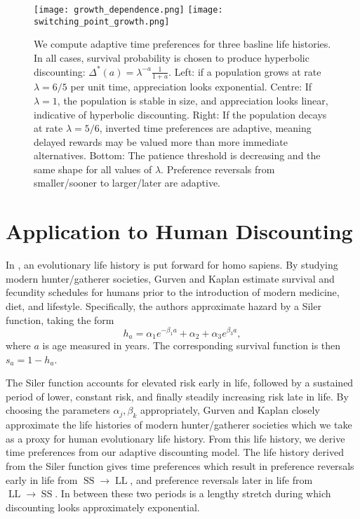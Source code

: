 \documentclass[titlepage, hidelinks, 12pt]{article}
\theoremstyle{plain}
\theoremstyle{remark}
\theoremstyle{definition}
\DeclareMathOperator{\smallersooner}{SS}
\DeclareMathOperator{\largerlater}{LL}
\begin{document}
\begin{figure}[H]
    \centering
    \texttt{[image: growth\_dependence.png]}
    \texttt{[image: switching\_point\_growth.png]}
    \caption{We compute adaptive time preferences for three basline life histories. In all cases, survival probability is chosen to 
        produce hyperbolic discounting: $\Delta^*(a) = \lambda^{-a}\frac{1}{1+a}$. 
        Left: if a population grows at rate $\lambda = 6/5$ per unit time, appreciation looks exponential.
        Centre: If $\lambda = 1$, the population is stable in size, and appreciation looks linear, indicative of hyperbolic discounting. Right:
        If the population decays at rate $\lambda = 5/6$, inverted time preferences are adaptive, meaning delayed rewards may be valued more than
        more immediate alternatives. Bottom: The patience threshold is decreasing and the same shape for all values of $\lambda$. Preference reversals
    from smaller/sooner to larger/later are adaptive.}
\end{figure}
\newpage


\section{Application to Human Discounting}
In \cite{gurven07}, an evolutionary life history is put forward for homo sapiens. By studying modern hunter/gatherer societies, Gurven and Kaplan 
estimate survival and fecundity schedules for humans prior to the introduction of modern medicine, diet, and lifestyle. Specifically,
the authors approximate hazard by a Siler function, taking the form
\begin{equation}
    h_a = \alpha_1 e^{-\beta_1 a} + \alpha_2 + \alpha_3 e^{\beta_3 a}, 
    \label{eqn:siler}
\end{equation}
where $a$ is age measured in years. The corresponding survival function is then $s_a = 1 - h_a$. 

The Siler function accounts for elevated risk early in life, followed by a sustained
period of lower, constant risk, and finally steadily increasing risk late in life. By choosing the parameters $\alpha_j, \beta_k$ appropriately,
Gurven and Kaplan closely approximate the life histories of modern hunter/gatherer societies which we take as a proxy for human
evolutionary life history. From this life history, we derive time preferences from our adaptive discounting model. The life history 
derived from the Siler function gives time preferences which 
result in preference reversals early in life from $\smallersooner\to\largerlater$, and preference reversals later in life 
from $\largerlater\to\smallersooner$.
In between these two periods is a lengthy stretch during which discounting looks approximately exponential. 
\end{document}
